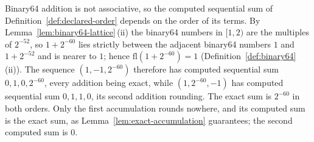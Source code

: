
\begin{remark}\label{rem:summation-order}
Binary64 addition is not associative, so the computed sequential sum of
Definition~\ref{def:declared-order} depends on the order of its terms. By
Lemma~\ref{lem:binary64-lattice}\,(ii) the binary64 numbers in $[1,2)$ are the
multiples of $2^{-52}$, so $1+2^{-60}$ lies strictly between the adjacent
binary64 numbers $1$ and $1+2^{-52}$ and is nearer to $1$; hence
$\mathrm{fl}(1+2^{-60})=1$ (Definition~\ref{def:binary64}\,(ii)). The
sequence $(1,-1,2^{-60})$ therefore has computed sequential sum
$0,1,0,2^{-60}$, every addition being exact, while $(1,2^{-60},-1)$ has
computed sequential sum $0,1,1,0$, its second addition rounding. The exact sum is $2^{-60}$ in both orders. Only the first
accumulation rounds nowhere, and its computed sum is the exact sum, as
Lemma~\ref{lem:exact-accumulation} guarantees; the second computed sum is
$0$.
\end{remark}
